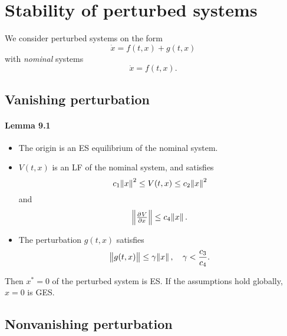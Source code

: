 \section{Stability of perturbed systems}
We consider perturbed systems on the form
\begin{equation}
	\dot{x} = f(t,x) + g(t,x)
\end{equation}
with \emph{nominal} systems
\begin{equation}
	\dot{x} = f(t,x)
	.
\end{equation}

\subsection{Vanishing perturbation}
\paragraph{Lemma 9.1}
\begin{itemize}
	\item The origin is an ES equilibrium of the nominal system.
	\item $V(t,x)$ is an LF of the nominal system, and satisfies
		\begin{equation}
			c_1 \norm{x}^2 \leq V(t,x) \leq c_2 \norm{x}^2
		\end{equation}
		and
		\begin{equation}
			\norm{\pd{V}{x}} \leq c_4 \norm{x}
			.
		\end{equation}
	\item The perturbation $g(t,x)$ satisfies
		\begin{equation}
			\norm{g(t,x)} \leq \gamma \norm{x}, \quad \gamma < \frac{c_3}{c_4}
			.
		\end{equation}
\end{itemize}
Then $x^* = 0$ of the perturbed system is ES. If the assumptions hold globally, $x = 0$ is GES.


\subsection{Nonvanishing perturbation}

